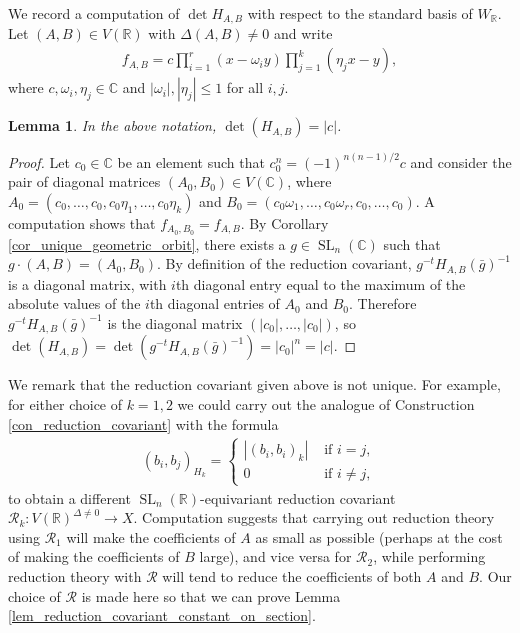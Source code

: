 \documentclass{article} %
\newtheorem{lemma}[proposition]{Lemma}
\numberwithin{equation}{section}
\DeclareMathOperator{\SL}{SL}
\newcommand{\R}{\mathbb{R}}
\begin{document}
We record a computation of $\det H_{A,B}$ with respect to the standard basis of $W_{\R}$.
Let $(A,B) \in V(\R)$ with $\Delta(A,B) \neq 0$ and write
\begin{align*}
    f_{A,B} = c \prod_{i=1}^r (x-\omega_i y) \prod_{j=1}^k (\eta_j x- y),
\end{align*}
where $c, \omega_i, \eta_j \in \mathbb{C}$ and $|\omega_i|, |\eta_j|\leq 1$ for all $i,j$.
\begin{lemma}\label{lemma: determinant of reduction covariant}
    In the above notation, $\det(H_{A,B}) = |c|$.
\end{lemma}
\begin{proof}
    Let $c_0\in \mathbb{C}$ be an element such that $c_0^n = (-1)^{n(n-1)/2}c$ and consider the pair of diagonal matrices $(A_0,B_0)\in V(\mathbb{C})$, where $A_0 = (c_0,\dots, c_0, c_0\eta_1,\dots,c_0\eta_k)$ and $B_0 = (c_0 \omega_1, \dots, c_0\omega_r, c_0,\dots, c_0)$.
    A computation shows that $f_{A_0,B_0} = f_{A,B}$.
    By Corollary \ref{cor_unique_geometric_orbit}, there exists a $g\in \SL_n(\mathbb{C})$ such that $g\cdot (A,B) = (A_0,B_0)$. 
    By definition of the reduction covariant, $g^{-t}H_{A,B}(\bar{g})^{-1}$ is a diagonal matrix, with $i$th diagonal entry equal to the maximum of the absolute values of the $i$th diagonal entries of $A_0$ and $B_0$. Therefore $g^{-t}H_{A,B}(\bar{g})^{-1}$ is the diagonal matrix $(|c_0|,\dots,|c_0|)$, so $\det(H_{A,B}) = \det(g^{-t}H_{A,B}(\bar{g})^{-1}) = |c_0|^n = |c|$.
\end{proof}
    We remark that the reduction covariant given above is not unique. For example, for either choice of $k = 1, 2$ we could carry out the analogue of Construction \ref{con_reduction_covariant} with the formula
    \begin{align*}
    (b_i,b_j)_{H_k} = 
    \begin{cases}
        |(b_i,b_i)_k| & \text{ if } i=j, \\
        0 & \text{ if } i\neq j,
    \end{cases}
\end{align*}
    to obtain a different $\SL_n(\R)$-equivariant reduction covariant $\mathcal{R}_k : V(\R)^{\Delta \neq 0} \to X$. Computation suggests that carrying out reduction theory using $\mathcal{R}_1$ will make the coefficients of $A$ as small as possible (perhaps at the cost of making the coefficients of $B$ large), and vice versa for $\mathcal{R}_2$, while performing reduction theory with $\mathcal{R}$ will tend to reduce the coefficients of both $A$ and $B$. Our choice of $\mathcal{R}$ is made here so that we can prove Lemma \ref{lem_reduction_covariant_constant_on_section}. 
\end{document}
